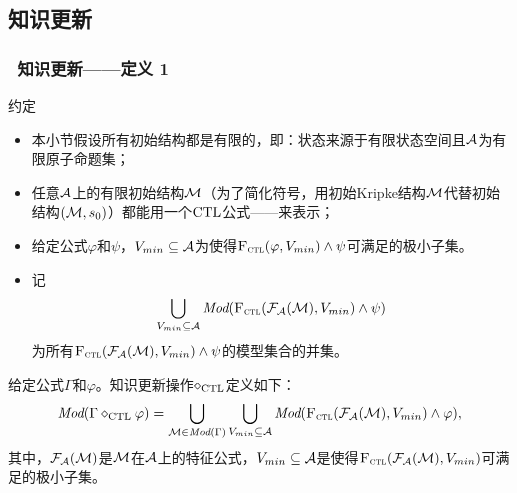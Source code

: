 \documentclass[9pt, CJK]{beamer}
\begin{document}
\subsection{知识更新}
\begin{frame}
	\frametitle{~知识更新——{\footnotesize 定义 1}}
	{\footnotesize
		\begin{block}{约定}
			\begin{itemize}
				\item 本小节假设所有初始结构都是有限的，即：状态来源于有限状态空间且${\cal A}$为有限原子命题集；
				\item 任意${\cal A}$上的有限初始结构${\cal M}$（为了简化符号，用初始Kripke结构${\cal M}$代替初始结构$({\cal M},s_0)$）都能用一个$\textrm{CTL}$公式——来表示；
				\item 给定公式$\varphi$和$\psi$，$V_{min}\subseteq {\cal A}$为使得${\textsc{F}_{\textsc{ctl}}}(\varphi, V_{min}) \wedge \psi$可满足的极小子集。
				\item 记
				$$\bigcup_{V_{min}\subseteq {\cal A}} \textit{Mod}({\textsc{F}_{\textsc{ctl}}}({\cal F}_{{\cal A}}({\cal M}), V_{min}) \wedge \psi)$$  
				为所有${\textsc{F}_{\textsc{ctl}}}({\cal F}_{{\cal A}}({\cal M}), V_{min}) \wedge \psi$的模型集合的并集。
			\end{itemize}
		\end{block}
	
	\begin{definition}\label{def:KU}
		给定公式$\Gamma$和$\varphi$。知识更新操作$\diamond_{\textrm{CTL}}$定义如下：
		\[
		\textit{Mod}(\Gamma \diamond_{\textrm{CTL}} \varphi) = \bigcup_{{\cal M} \in \textit{Mod}(\Gamma)} \bigcup_{V_{min}\subseteq {\cal A}} \textit{Mod}({\textsc{F}_{\textsc{ctl}}}({\cal F}_{{\cal A}}({\cal M}), V_{min}) \wedge \varphi),
		\]
		其中，${\cal F}_{{\cal A}}({\cal M})$是${\cal M}$在${\cal A}$上的特征公式，$V_{min} \subseteq {\cal A}$是使得${\textsc{F}_{\textsc{ctl}}}({\cal F}_{{\cal A}}({\cal M}), V_{min})$可满足的极小子集。
	\end{definition}
	}
\end{frame}
\end{document}
